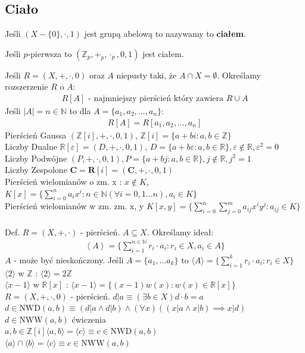 \documentclass{article}
\numberwithin{equation}{subsection}
\begin{document}
\subsection{Ciało}

\noindent
Jeśli $(X-\{0\},\cdot, 1)$ jest grupą abelową to nazywamy to \textbf{ciałem}.

\noindent
Jeśli $p$-pierwsza to $(\mathbb{Z}_p, +_p, \cdot_p,0,1)$ jest ciałem.

\noindent
Jeśli $R=(X,+,\cdot,0)$ oraz $A$ niepusty taki, że $A\cap X = \emptyset$. Określamy rozszerzenie $R$ o $A$:
\begin{align*}
    R[A] \text{ - najmniejszy pierścień który zawiera } R\cup A
\end{align*}
Jeśli $|A|=n\in \mathbb{N}$ to dla $A=\{a_1,a_2,\dots, a_n\}$:
\begin{align*}
    R[A] = R[a_1,a_2,\dots,a_n]
\end{align*}
Pierścień Gaussa $(\mathbb{Z}[i], +,\cdot,0,1)$, $\mathbb{Z}[i] = \{a+bi : a,b \in \mathbb{Z}\}$\\
Liczby Dualne $\mathbb{R}[\varepsilon] = (D, +,\cdot,0,1)$, $D=\{a+b\varepsilon : a,b\in\mathbb{R}\}, \varepsilon \notin \mathbb{R}, \varepsilon^2=0$\\ 
Liczby Podwójne $(P,+,\cdot, 0,1), P=\{a+bj : a,b\in\mathbb{R}\}, j\notin\mathbb{R}, j^2=1$\\
Liczby Zespolone $\mathbf{C} = \mathbf{R}[i] = (\mathbf{C}, +, \cdot, 0,1)$\\
Pierścień wielomianów o zm. x : $x\notin K$, $K[x] = \{\sum_{i=0}^{n} a_i x^i : n\in\mathbb{N} \left(\forall i=0,1\dots n\right), a_i \in K\}$\\
Pierścień wielomianów w zm. zm. x, y $K[x,y] = \{\sum_{i=0}^{n}\sum_{j=0}^{m} a_{ij} x^i y^j : a_{ij} \in K\}$\\\\

Def. $R=(X,+,\cdot)$ - pierścień. $A\subseteq X$. Określamy ideał:
\begin{align*}
    \left\langle  A\right\rangle = \{\sum_{i=1}^{n\in \mathbb{N}} r_i \cdot a_i : r_i \in X, a_i \in A\}
\end{align*}
$A$ - może być nieskończony. Jeśli $A = \{a_1,\dots a_k\}$ to $\langle A \rangle = \{\sum_{i=1}^{k} r_i \cdot a_i : r_i \in X\}$\\
$\langle 2 \rangle$ w $\mathbb{Z}$ : $\langle 2 \rangle = 2\mathbb{Z}$\\
$\langle x - 1 \rangle$ w $\mathbb{R}[x]$ : $\langle x - 1 \rangle = \{(x-1)w(x) : w(x) \in \mathbb{R}[x]\}$\\
$R = (X,+,\cdot,0)$ - pierścień. $d|a \equiv \left(\exists b \in X\right) d\cdot b = a$\\
$d \in \text{NWD}(a,b) \equiv (d | a \land d | b) \land \left(\forall x\right) \left((x | a \land x | b) \implies x | d\right)$\\
$d \in \text{NWW}(a,b)$ ćwiczenia\\
$a,b\in \mathbb{Z}[i] \langle a,b \rangle = \langle c \rangle \equiv c \in \text{NWD}(a,b)$\\
$\langle a \rangle \cap \langle b \rangle = \langle c \rangle \equiv c \in \text{NWW}(a,b)$
\end{document}
